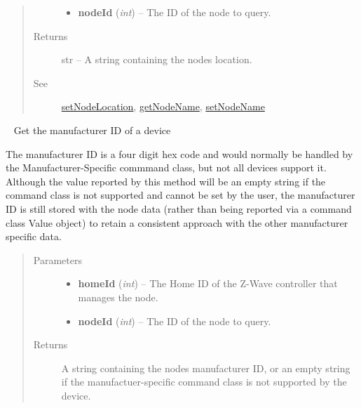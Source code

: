 \documentclass[letterpaper,10pt,english]{sphinxmanual}
\begin{document}
\begin{fulllineitems}
\begin{fulllineitems}
\begin{quote}
\begin{description}
\begin{itemize}
\item {} 
\textbf{nodeId} (\emph{int}) -- The ID of the node to query.

\end{itemize}

\item[{Returns}] \leavevmode
str -- A string containing the nodes location.

\item[{See}] \leavevmode
{\hyperref[libopenzwave:setnodelocation]{setNodeLocation}}, {\hyperref[libopenzwave:getnodename]{getNodeName}}, {\hyperref[libopenzwave:setnodename]{setNodeName}}

\end{description}\end{quote}

\end{fulllineitems}


\begin{fulllineitems}
\label{libopenzwave:libopenzwave.PyManager.getNodeManufacturerId}~\label{libopenzwave:getnodemanufacturerid}
Get the manufacturer ID of a device

The manufacturer ID is a four digit hex code and would normally be handled by
the Manufacturer-Specific commmand class, but not all devices support it.
Although the value reported by this method will be an empty string if the
command class is not supported and cannot be set by the user, the manufacturer
ID is still stored with the node data (rather than being reported via a command
class Value object) to retain a consistent approach with the other manufacturer
specific data.
\begin{quote}\begin{description}
\item[{Parameters}] \leavevmode\begin{itemize}
\item {} 
\textbf{homeId} (\emph{int}) -- The Home ID of the Z-Wave controller that manages the node.

\item {} 
\textbf{nodeId} (\emph{int}) -- The ID of the node to query.

\end{itemize}

\item[{Returns}] \leavevmode
A string containing the nodes manufacturer ID, or an empty string if the manufactuer-specific command class is not supported by the device.


\end{description}
\end{quote}
\end{fulllineitems}
\end{fulllineitems}
\end{document}
